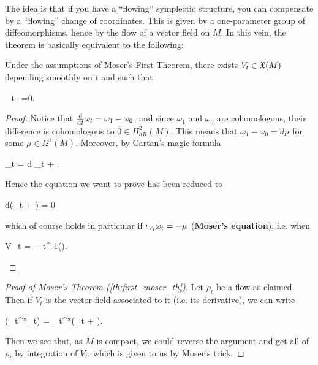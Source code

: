 \documentclass[main.tex]{subfiles}
\begin{document}
The idea is that if you have a ``flowing'' symplectic structure, you can compensate by a ``flowing'' change of coordinates. This is given by a one-parameter group of diffeomorphisms, hence by the flow of a vector field on $M$. In this vein, the theorem is basically equivalent to the following:

\begin{lemma}
	Under the assumptions of Moser's First Theorem, there exists $V_t \in \mathfrak{X}(M)$ depending smoothly on $t$ and such that
	\begin{eqalign}
		\omega_t+=0.
	\end{eqalign}
\end{lemma}
\begin{proof}
	Notice that $\frac{\mathrm{d}{}}{\mathrm{d}{t}} \omega_t = \omega_1-\omega_0$, and since $\omega_1$ and $\omega_0$ are cohomologous, their difference is cohomologous to $\overline 0 \in H^2_{dR}(M)$. This means that $\omega_1 -\omega_0 = d\mu$ for some $\mu \in \Omega^1(M)$. Moreover, by Cartan's magic formula
	\begin{eqalign}
		\omega_t = d \omega_t + \cancel{\ipr{V_t}d\omega_t}.
	\end{eqalign}
	Hence the equation we want to prove has been reduced to
	\begin{eqalign}
		d(\omega_t + \mu) = 0
	\end{eqalign}
	which of course holds in particular if $\iota_{V_t}\omega_t = -\mu$ (\textbf{Moser's equation}), i.e. when
	\begin{eqalign}
		V_t = -\omega_t^{-1}(\mu).
	\end{eqalign}
\end{proof}

\begin{proof}[Proof of Moser's Theorem (\ref{th:first_moser_th})]
	Let $\rho_t$ be a flow as claimed. Then if $V_t$ is the vector field associated to it (i.e. its derivative\footnotemark), we can write
	\begin{eqalign}
	\label{eq:der_of_flowing_symp}
		(\rho_t^*\omega_t) = \rho_t^*\left(\omega_t + \right).
	\end{eqalign}
	Then we see that, as $M$ is compact, we could reverse the argument and get all of $\rho_t$ by integration of $V_t$, which is given to us by Moser's trick.
\end{proof}
\end{document}
